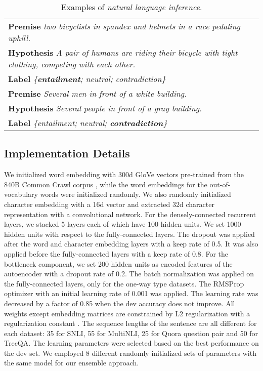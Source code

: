 \documentclass[letterpaper]{article} \usepackage{aaai19}  \usepackage{times}  \usepackage{helvet}  \usepackage{courier}  \usepackage{url}  \usepackage{graphicx}  \frenchspacing  \setlength{\pdfpagewidth}{8.5in}  \setlength{\pdfpageheight}{11in}
\begin{document}
\begin{table}
\resizebox{\linewidth}{!}
{
\begin{tabular}{p{2.8in}}
	\hline
	\textbf{Premise} {\em two bicyclists in spandex and helmets in a race pedaling uphill.} \\
    \textbf{Hypothesis} {\em A pair of humans are riding their
    bicycle with tight clothing, competing with each other.} \\
    \textbf{Label}  {\em\{\textbf{entailment}; neutral; contradiction\}}
\\
	\hline
    \textbf{Premise} {\em Several men in front of a white building.} \\
    \textbf{Hypothesis} {\em Several people in front of a gray building.} \\
    \textbf{Label}  {\em\{entailment; neutral; \textbf{contradiction}\}}
\\
	\hline
\end{tabular}
}
\caption{Examples of \textit{natural language inference}.}
\label{tab:NLI}
\end{table}


\subsection{Implementation Details}
We initialized word embedding with 300d GloVe vectors pre-trained from the 840B Common Crawl corpus \cite{pennington2014glove}, while the word embeddings for the out-of-vocabulary words were initialized randomly. We also randomly initialized character embedding with a 16d vector and extracted 32d character representation with a convolutional network. For the densely-connected recurrent layers, we stacked 5 layers each of which have 100 hidden units. We set 1000 hidden units with respect to the fully-connected layers. The dropout was applied after the word and character embedding layers with a keep rate of 0.5. It was also applied before the fully-connected layers with a keep rate of 0.8. 
For the bottleneck component, we set 200 hidden units as encoded features of the autoencoder with a dropout rate of 0.2.
The batch normalization was applied on the fully-connected layers, only for the one-way type datasets. 
The RMSProp optimizer with an initial learning rate of 0.001 was applied. 
The learning rate was decreased by a factor of 0.85 when the dev accuracy does not improve. All weights except embedding matrices are constrained by L2 regularization with a regularization constant . The sequence lengths of the sentence are all different for each dataset: 35 for SNLI, 55 for MultiNLI, 25 for Quora question pair and 50 for TrecQA. 
The learning parameters were selected based on the best performance on the dev set. 
We employed 8 different randomly initialized sets of parameters with the same model for our ensemble approach.
\end{document}
